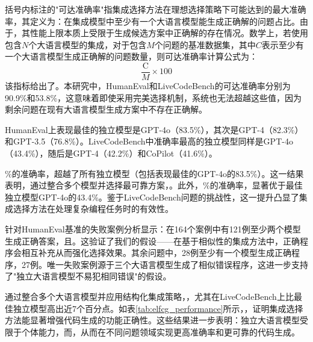 \documentclass{article}
\newcommand{\tool}{EnsLLM}
\begin{document}
括号内标注的"可达准确率"指集成选择方法在理想选择策略下可能达到的最大准确率，其定义为：在集成模型中至少有一个大语言模型能生成正确解的问题占比。由于，其性能上限本质上受限于生成候选方案中正确解的存在情况。数学上，若使用包含\( N \)个大语言模型的集成，对于包含\( M \)个问题的基准数据集，其中\( C \)表示至少有一个大语言模型生成正确解的问题数量，则可达准确率计算公式为：
\[
\frac{\text{C}}{M} \times 100
\]
该指标给出了。本研究中，HumanEval和LiveCodeBench的可达准确率分别为90.9\%和53.8\%，这意味着即使采用完美选择机制，系统也无法超越这些值，因为剩余问题在现有大语言模型生成方案中不存在正确解。

HumanEval上表现最佳的独立模型是GPT-4o（83.5\%），其次是GPT-4（82.3\%）和GPT-3.5（76.8\%）。LiveCodeBench中准确率最高的独立模型同样是GPT-4o（43.4\%），随后是GPT-4（42.2\%）和CoPilot（41.6\%）。

\%的准确率，超越了所有独立模型（包括表现最佳的GPT-4o的83.5\%）。这一结果表明，通过整合多个模型并选择最可靠方案，。此外，\%的准确率，显著优于最佳独立模型GPT-4o的43.4\%。鉴于LiveCodeBench问题的挑战性，这一提升凸显了集成选择方法在处理复杂编程任务时的有效性。

针对HumanEval基准的失败案例分析显示：在164个案例中有121例至少两个模型生成正确答案，且。这验证了我们的假设——在基于相似性的集成方法中，正确程序会相互补充从而强化选择效果。其余问题中，28例至少有一个模型生成正确程序，27例。唯一失败案例源于三个大语言模型生成了相似错误程序，这进一步支持了"独立大语言模型不易犯相同错误"的假设。

通过整合多个大语言模型并应用结构化集成策略，，尤其在LiveCodeBench上比最佳独立模型高出近7个百分点。如表\ref{tab:elfcg_performance}所示，，证明集成选择方法能显著增强代码生成的功能正确性。这些结果进一步表明：独立大语言模型受限于个体能力，而，从而在不同问题领域实现更高准确率和更可靠的代码生成。
\end{document}
